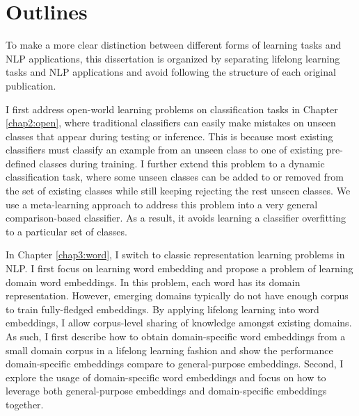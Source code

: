 \section{Outlines}
To make a more clear distinction between different forms of learning tasks and NLP applications, this dissertation is organized by separating lifelong learning tasks and NLP applications and avoid following the structure of each original publication.


I first address open-world learning problems on classification tasks in Chapter \ref{chap2:open}, where traditional classifiers can easily make mistakes on unseen classes that appear during testing or inference. 
This is because most existing classifiers must classify an example from an unseen class to one of existing pre-defined classes during training. 
I further extend this problem to a dynamic classification task, where some unseen classes can be added to or removed from the set of existing classes while still keeping rejecting the rest unseen classes. We use a meta-learning approach to address this problem into a very general comparison-based classifier.
As a result, it avoids learning a classifier overfitting to a particular set of classes.

In Chapter \ref{chap3:word}, I switch to classic representation learning problems in NLP.
I first focus on learning word embedding and propose a problem of learning domain word embeddings.
In this problem, each word has its domain representation.
However, emerging domains typically do not have enough corpus to train fully-fledged embeddings.
By applying lifelong learning into word embeddings, I allow corpus-level sharing of knowledge amongst existing domains. 
As such, I first describe how to obtain domain-specific word embeddings from a small domain corpus in a lifelong learning fashion and show the performance domain-specific embeddings compare to general-purpose embeddings.
Second, I explore the usage of domain-specific word embeddings and focus on how to leverage both general-purpose embeddings and domain-specific embeddings together.

